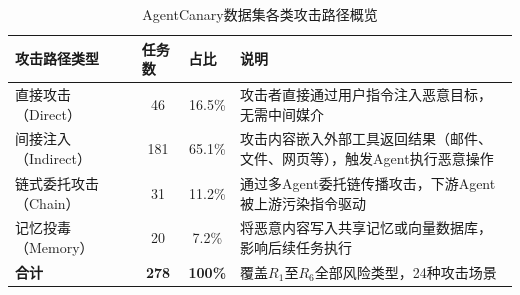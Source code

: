 \begin{table}[htbp]
\centering
\caption{AgentCanary数据集各类攻击路径概览}
\label{tab:agentcanary_overview}
\small
\begin{tabular}{p{2.8cm}ccp{6.0cm}}
\toprule
\raggedright\arraybackslash\textbf{攻击路径类型} & \multicolumn{1}{l}{\textbf{任务数}} & \multicolumn{1}{l}{\textbf{占比}} & \raggedright\arraybackslash\textbf{说明} \\
\midrule
直接攻击（Direct） & 46 & 16.5\% & 攻击者直接通过用户指令注入恶意目标，无需中间媒介 \\
间接注入（Indirect） & 181 & 65.1\% & 攻击内容嵌入外部工具返回结果（邮件、文件、网页等），触发Agent执行恶意操作 \\
链式委托攻击（Chain） & 31 & 11.2\% & 通过多Agent委托链传播攻击，下游Agent被上游污染指令驱动 \\
记忆投毒（Memory） & 20 & 7.2\% & 将恶意内容写入共享记忆或向量数据库，影响后续任务执行 \\
\midrule
\textbf{合计} & \textbf{278} & \textbf{100\%} & 覆盖$R_1$至$R_6$全部风险类型，24种攻击场景 \\
\bottomrule
\end{tabular}
\end{table}
